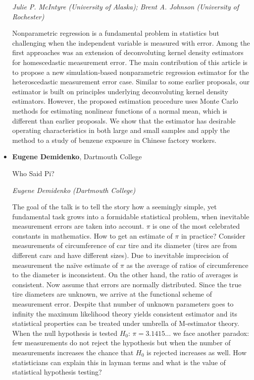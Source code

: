 \begin{itemize}
\emph{\footnotesize Julie P. McIntyre (University of Alaska); Brent A. Johnson (University of Rochester)}

Nonparametric regression is a fundamental problem in statistics but challenging when the independent variable is measured with error.  Among the first approaches was an extension of deconvoluting kernel density estimators for homescedastic measurement error. The main contribution of this article is to propose a new simulation-based nonparametric regression estimator for the heteroscedastic measurement error case.  Similar to some earlier proposals, our estimator is built on principles underlying deconvoluting kernel density estimators. However, the proposed estimation procedure uses Monte Carlo methods for estimating nonlinear functions of a normal mean, which is different than earlier proposals.  We show that the estimator has desirable operating characteristics in both large and small samples and apply the method to a study of benzene exposure in Chinese factory workers.

\item \textbf{Eugene Demidenko}, Dartmouth College

Who Said Pi?

\emph{\footnotesize Eugene Demidenko (Dartmouth College)}

The goal of the talk is to tell the story how a seemingly simple, yet fundamental task grows into a formidable statistical problem, when inevitable measurement errors are taken into account. $\pi$ is one of the most celebrated constants in mathematics. How to get an estimate of $\pi$ in practice? Consider measurements of circumference of car tire and its diameter (tires are from different cars and have different sizes). Due to inevitable imprecision of measurement the naïve estimate of $\pi$ as the average of ratios of circumference to the diameter is inconsistent. On the other hand, the ratio of averages is consistent. Now assume that errors are normally distributed. Since the true tire diameters are unknown, we arrive at the functional scheme of measurement error. Despite that number of unknown parameters goes to infinity the maximum likelihood theory yields consistent estimator and its statistical properties can be treated under umbrella of M-estimator theory. When the null hypothesis is tested $H_0$: $\pi= 3.1415\ldots$ we face another paradox: few measurements do not reject the hypothesis but when the number of measurements increases the chance that $H_0$ is rejected increases as well. How statisticians can explain this in layman terms and what is the value of statistical hypothesis testing?

\end{itemize}

